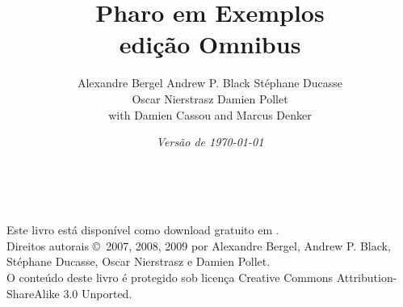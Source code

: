 \documentclass[a4paper,10pt,twoside]{book}
\begin{document}
\frontmatter
\setcounter{page}{1}
\pagestyle{headings}
\author{
	 Alexandre Bergel\quad
	Andrew P. Black\quad
	St\'ephane Ducasse\\[1ex]
	Oscar Nierstrasz\quad
	Damien Pollet
	\\[4ex]
	with Damien Cassou and Marcus Denker}
\title{\Huge\bf Pharo em Exemplos\\ edição Omnibus}
\isodate
\date{\emph{Versão de \today}}
\maketitle
~ %
\vfill
\begin{footnotesize}
\setlength{\parindent}{0pt}
Este livro está disponível como download gratuito em \pbe.\\[1cm]

Direitos autorais \copyright~2007, 2008, 2009 por Alexandre Bergel, Andrew P. Black, St\'ephane Ducasse, Oscar Nierstrasz e Damien Pollet.\\[1cm]

O conteúdo deste livro é protegido sob licença Creative Commons Attribution-ShareAlike 3.0 Unported.


\end{footnotesize}
\end{document}
